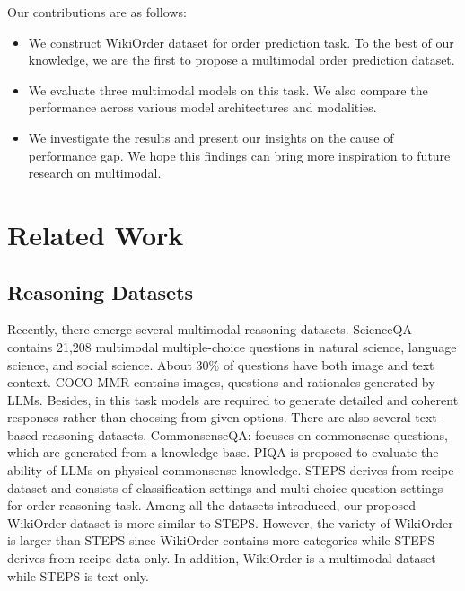 \documentclass[11pt]{article}
\newcommand{\MY}[1]{\textcolor{orange}{(Mengyue: #1})}
\begin{document}
Our contributions are as follows:
\begin{itemize}
    \item We construct WikiOrder dataset for order prediction task. To the best of our knowledge, we are the first to propose a multimodal order prediction dataset.
    \item We evaluate three multimodal models on this task. We also compare the performance across various model architectures and modalities.
    \item We investigate the results and present our insights on the cause of performance gap. We hope this findings can bring more inspiration to future research on multimodal.
\end{itemize}

\section{Related Work}

\subsection{Reasoning Datasets}
Recently, there emerge several multimodal reasoning datasets. ScienceQA\citep{lu2022learn} contains 21,208 multimodal multiple-choice questions in natural science, language science, and social science. About 30\% of questions have both image and text context. COCO-MMR\citep{wei2023enhancing} contains images, questions and rationales generated by LLMs. Besides, in this task models are required to generate detailed and coherent responses rather than choosing from given options. There are also several text-based reasoning datasets. CommonsenseQA:\citep{talmor2018commonsenseqa} focuses on commonsense questions, which are generated from a knowledge base. PIQA\citep{bisk2020piqa} is proposed to evaluate the ability of LLMs on physical commonsense knowledge. STEPS\citep{wang2023steps} derives from recipe dataset and consists of classification settings and multi-choice question settings for order reasoning task. Among all the datasets introduced, our proposed WikiOrder dataset is more similar to STEPS. However, the variety of WikiOrder is larger than STEPS since WikiOrder contains more categories while STEPS derives from recipe data only. In addition, WikiOrder is a multimodal dataset while STEPS is text-only.
\end{document}
